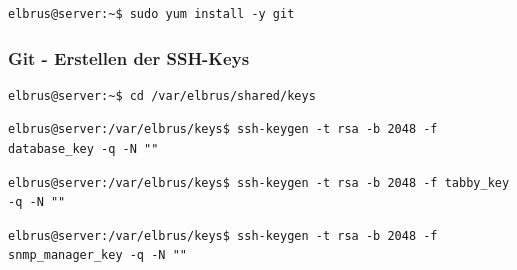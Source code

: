 \documentclass{article}
\begin{document}
	\lstset{style=commands}
	\begin{lstlisting}[caption={Installieren von dem VCS 'git'.}]
		elbrus@server:~$ sudo yum install -y git
	\end{lstlisting}
	
	\lstset{style=commands}
	\subsubsection{Git - Erstellen der SSH-Keys}
	\begin{lstlisting}[caption={Wechseln des Verzeichnisses.}]
		elbrus@server:~$ cd /var/elbrus/shared/keys
	\end{lstlisting}
	
	\lstset{style=commands}
	\begin{lstlisting}[caption={Erstellen des SSH-keys der für das Herunterladen der 'Database' benötigt wird.}]
		elbrus@server:/var/elbrus/keys$ ssh-keygen -t rsa -b 2048 -f database_key -q -N ""
	\end{lstlisting}



	\lstset{style=commands}
	\begin{lstlisting}[caption={Erstellen des SSH-Keys der für das Herunterladen der Kernsoftware 'tabby' benötigt wird.}]
		elbrus@server:/var/elbrus/keys$ ssh-keygen -t rsa -b 2048 -f tabby_key -q -N ""
	\end{lstlisting}

	\lstset{style=commands}
	\begin{lstlisting}[caption={Erstellen des SSH-keys der für das Herunterladen des 'SNMP-Managers' benötigt wird.}]
		elbrus@server:/var/elbrus/keys$ ssh-keygen -t rsa -b 2048 -f snmp_manager_key -q -N ""
	\end{lstlisting}
\end{document}

